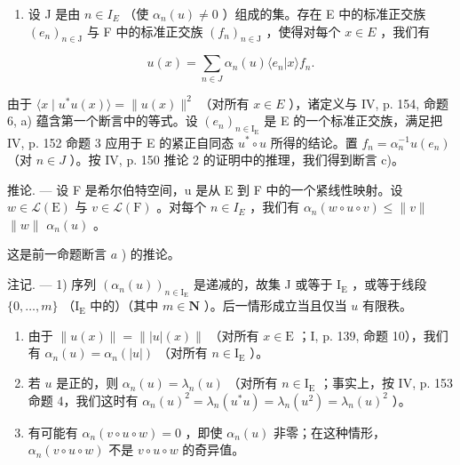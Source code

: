 \begin{enumerate}
\def\labelenumi{\alph{enumi})}
\setcounter{enumi}{1}
\tightlist
\item
  设 J 是由 \(n \in I_{E}\) （使 \(\alpha_{n}(u) \neq 0\) ）组成的集。存在 E 中的标准正交族 \((e_{n})_{n \in \mathrm{J}}\) 与 F 中的标准正交族 \((f_{n})_{n \in \mathrm{J}}\) ，使得对每个 \(x \in E\) ，我们有
\end{enumerate}

\[
u (x) = \sum_ {n \in J} \alpha_ {n} (u) \langle e _ {n} | x \rangle f _ {n}.
\]

由于 \(\langle x \mid u^{*}u(x)\rangle = \|u(x)\|^{2}\) （对所有 \(x \in E\) ），诸定义与 IV, p. 154, 命题 6, a) 蕴含第一个断言中的等式。设 \((e_{n})_{n\in\mathrm{I}_{\mathrm{E}}}\) 是 E 的一个标准正交族，满足把 IV, p. 152 命题 3 应用于 E 的紧正自同态 \(u^{*} \circ u\) 所得的结论。置 \(f_{n} = \alpha_{n}^{-1}u(e_{n})\) （对 \(n \in J\) ）。按 IV, p. 150 推论 2 的证明中的推理，我们得到断言 c)。

推论. --- 设 F 是希尔伯特空间，u 是从 E 到 F 中的一个紧线性映射。设 \(w \in \mathcal{L}(\mathrm{E})\) 与 \(v \in \mathcal{L}(\mathrm{F})\) 。对每个 \(n \in I_{E}\) ，我们有 \(\alpha_{n}(w \circ u \circ v) \leqslant \|v\|\) \(\|w\|\) \(\alpha_{n}(u)\) 。

这是前一命题断言 \(a\) ) 的推论。

注记. --- 1) 序列 \((\alpha_{n}(u))_{n\in\mathrm{I}_{\mathrm{E}}}\) 是递减的，故集 J 或等于 \(\mathrm{I}_{\mathrm{E}}\) ，或等于线段 \(\{0,\ldots,m\}\) （\(\mathrm{I}_{\mathrm{E}}\) 中的）（其中 \(m\in\mathbf{N}\) ）。后一情形成立当且仅当 \(u\) 有限秩。

\begin{enumerate}
\def\labelenumi{\arabic{enumi})}
\setcounter{enumi}{1}
\item
  由于 \(\| u(x)\| = \| |u|(x)\|\) （对所有 \(x\in \mathrm{E}\) ；I, p. 139, 命题 10），我们有 \(\alpha_{n}(u) = \alpha_{n}(|u|)\) （对所有 \(n\in \mathrm{I}_{\mathrm{E}}\) ）。
\item
  若 \(u\) 是正的，则 \(\alpha_{n}(u)=\lambda_{n}(u)\) （对所有 \(n\in\mathrm{I}_{\mathrm{E}}\) ；事实上，按 IV, p. 153 命题 4，我们这时有 \(\alpha_{n}(u)^{2}=\lambda_{n}(u^{*}u)=\lambda_{n}(u^{2})=\lambda_{n}(u)^{2}\) ）。
\item
  有可能有 \(\alpha_{n}(v\circ u\circ w)=0\) ，即使 \(\alpha_{n}(u)\) 非零；在这种情形，\(\alpha_{n}(v\circ u\circ w)\) 不是 \(v\circ u\circ w\) 的奇异值。
\end{enumerate}